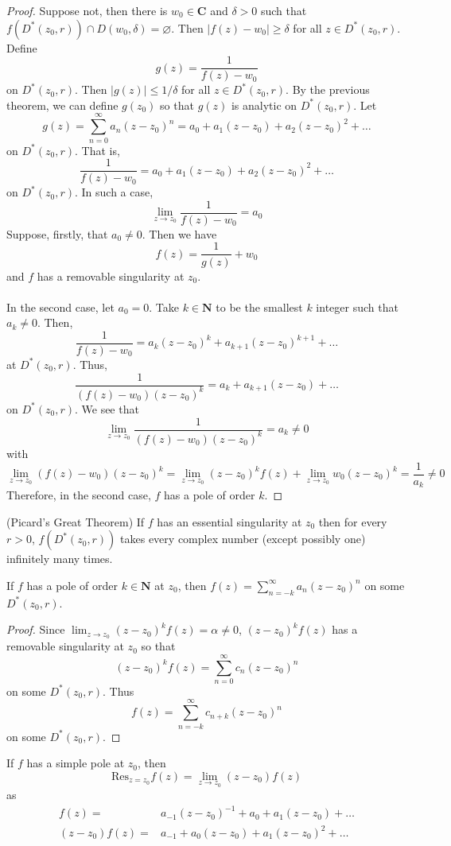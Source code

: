 \begin{proof}
Suppose not, then there is $w_0\in {\bm C}$ and $\delta >0$ such that $f(D^{*}(z_0,r))\cap D(w_0,\delta )=\varnothing$. Then $|f(z)-w_0|\geq \delta $ for all $z\in D^{*}(z_0,r)$. Define 
\[g(z)=\dfrac{1}{f(z)-w_0}\]
on $D^{*}(z_0,r)$. Then $|g(z)|\leq 1/\delta $ for all $z\in D^{*}(z_0,r)$. By the previous theorem, we can define $g(z_0)$ so that $g(z)$ is analytic on $D^{*}(z_0,r)$. Let 
\[g(z)=\sum ^{\infty }_{n=0}a_{n}(z-z_0)^{n}=a_0+a_1(z-z_0)+a_2(z-z_0)^2+\ldots \]
on $D^{*}(z_0,r)$. That is,
\[\dfrac{1}{f(z)-w_0}=a_0+a_1(z-z_0)+a_2(z-z_0)^2+\ldots \]
on $D^{*}(z_0,r)$. In such a case, 
\[\lim _{z\rightarrow z_0}\dfrac{1}{f(z)-w_0}=a_0\]
Suppose, firstly, that $a_0\ne 0$. Then we have
\[f(z)=\dfrac{1}{g(z)}+w_0\]
and $f$ has a removable singularity at $z_0$. 
\\\\
In the second case, let $a_0=0$. Take $k\in {\bm N}$ to be the smallest $k$ integer such that $a_{k}\ne 0$. Then,
\[\dfrac{1}{f(z)-w_0}=a_{k}(z-z_0)^{k}+a_{k+1}(z-z_0)^{k+1}+\ldots \]
at $D^{*}(z_0,r)$. Thus, 
\[\dfrac{1}{(f(z)-w_0)(z-z_0)^{k}}=a_{k}+a_{k+1}(z-z_0)+\ldots \]
on $D^{*}(z_0,r)$. We see that
\[\lim _{z\rightarrow z_0}\dfrac{1}{(f(z)-w_0)(z-z_0)^{k}}=a_{k}\ne 0\]
with
\[\lim _{z\rightarrow z_0}(f(z)-w_0)(z-z_0)^{k}=\lim _{z\rightarrow z_0}(z-z_0)^{k}f(z)+\lim _{z\rightarrow z_0}w_0(z-z_0)^{k}=\dfrac{1}{a_{k}}\ne 0\]
Therefore, in the second case, $f$ has a pole of order $k$.
\end{proof}
\vspace{2ex}
\begin{thm}
(Picard's Great Theorem) If $f$ has an essential singularity at $z_0$ then for every $r>0$, $f(D^{*}(z_0,r))$ takes every complex number (except possibly one) infinitely many times.
\end{thm}
\vspace{2ex}
\begin{thm}
If $f$ has a pole of order $k\in {\bm N}$ at $z_0$, then $f(z)=\sum ^{\infty }_{n=-k}a_{n}(z-z_0)^{n}$ on some $D^{*}(z_0,r)$.
\end{thm}
\vspace{2ex}
\begin{proof}
Since $\lim _{z\rightarrow z_0}(z-z_0)^{k}f(z)=\alpha \ne 0$, $(z-z_0)^{k}f(z)$ has a removable singularity at $z_0$ so that 
\[(z-z_0)^{k}f(z)=\sum _{n=0}^{\infty }c_{n}(z-z_0)^{n}\]
on some $D^{*}(z_0,r)$. Thus 
\[f(z)=\sum ^{\infty }_{n=-k}c_{n+k}(z-z_0)^{n}\]
on some $D^{*}(z_0,r)$.
\end{proof}
\vspace{2ex}
\begin{cor}
If $f$ has a simple pole at $z_0$, then 
\[\mathrm{Res}_{z=z_0}f(z)=\lim _{z\rightarrow z_0}(z-z_0)f(z)\]
as 
\begin{align*}
f(z)=& a_{-1}(z-z_0)^{-1}+a_0+a_1(z-z_0)+\ldots \\
(z-z_0)f(z)=&a_{-1}+a_0(z-z_0)+a_1(z-z_0)^2+\ldots 
\end{align*}
\end{cor}
\vspace{2ex}

